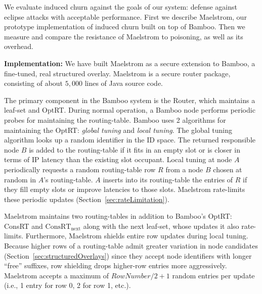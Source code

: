 \documentclass[10pt,twocolumn]{article}
\renewcommand{\paragraph}[1]{\textbf{#1:}}
\newcommand{\PRT}{OptRT\xspace}
\newcommand{\CRT}{ConsRT\xspace}
\newcommand{\CRTNext}{$\mathrm{\CRT}_{\mbox{next}}$\xspace}
\begin{document}
\label{sec:evaluation}

We evaluate induced churn against the goals of our system: defense against
eclipse attacks with acceptable performance.  First we describe Maelstrom, our prototype
implementation of induced churn built on top of Bamboo.  Then we measure
and compare the resistance of Maelstrom to poisoning, as well as its
overhead.


\paragraph{Implementation}
We have built Maelstrom as a secure extension to Bamboo, 
a fine-tuned, real structured overlay. Maelstrom is a secure router package, consisting
of about $5,000$ lines of Java source code.

The primary component in the Bamboo system is the Router, which
maintains 
a leaf-set
and
\PRT. During normal operation, a
Bamboo node performs periodic probes for maintaining the routing-table. 
Bamboo uses 2 algorithms for maintaining the \PRT: \textit{global tuning} and
\textit{local tuning}. The global tuning algorithm looks up 
a random identifier in the ID space. The returned responsible node $B$
is added to the routing-table if it
fits in an empty slot or is closer in terms of IP latency than the
existing slot occupant. Local tuning at node $A$ periodically requests a
random routing-table row $R$ from 
a node $B$ chosen at random in $A$'s routing-table.
$A$ inserts into its routing-table the entries of $R$ if they fill empty
slots or improve latencies to those slots.
Maelstrom rate-limits these periodic updates
(Section~\ref{sec:rateLimitation}).


Maelstrom maintains two routing-tables in addition to
Bamboo's \PRT:
\CRT and \CRTNext along with the next leaf-set, whose updates it also rate-limits.
Furthermore, Maelstrom shields entire row
updates during local tuning.
Because higher
rows of a routing-table admit greater variation in node candidates (Section~\ref{sec:structuredOverlays}) since they
accept node identifiers with longer ``free'' suffixes, row
shielding drops higher-row entries more aggressively. 
Maelstrom accepts a maximum of $RowNumber/2+1$ random entries per update (i.e., 1 entry for row 0, 2 for
row 1, etc.).
\end{document}

